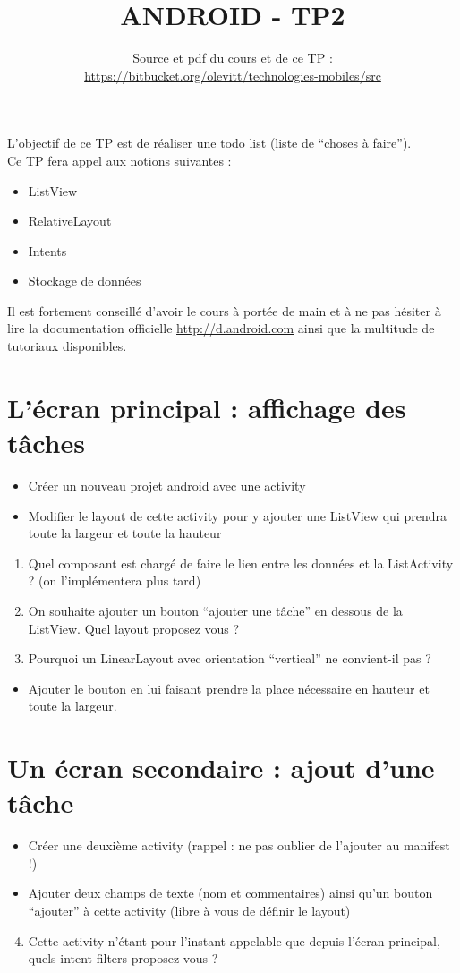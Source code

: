 \documentclass{article}
\title{ANDROID - TP2}
\date{Source et pdf du cours et de ce TP
:\\ \href{https://bitbucket.org/olevitt/technologies-mobiles}{https://bitbucket.org/olevitt/technologies-mobiles/src}}
\begin{document}
\maketitle
L'objectif de ce TP est de réaliser une todo list (liste de ``choses à faire'').\\
Ce TP fera appel aux notions suivantes :
\begin{itemize}
  \item ListView
  \item RelativeLayout
  \item Intents
  \item Stockage de données
\end{itemize}
Il est fortement conseillé d'avoir le cours à portée de main et à ne pas hésiter à lire la documentation officielle
\href{http://d.android.com}{http://d.android.com} ainsi que la multitude de tutoriaux disponibles.\\

\section{L'écran principal : affichage des tâches}
\begin{itemize}
  \item Créer un nouveau projet android avec une activity
  \item Modifier le layout de cette activity pour y ajouter une ListView qui prendra toute la largeur et toute la hauteur
\end{itemize}
\begin{enumerate}
 \setcounter{enumi}{0}
 \item Quel composant est chargé de faire le lien entre les données et la ListActivity ? (on l'implémentera plus tard)
\item On souhaite ajouter un bouton ``ajouter une tâche'' en dessous de la ListView. Quel layout proposez vous ?
\item Pourquoi un LinearLayout avec orientation ``vertical'' ne convient-il pas ?
\end{enumerate}
\begin{itemize}
  \item Ajouter le bouton en lui faisant prendre la place nécessaire en hauteur et toute la largeur.
\end{itemize}
\section{Un écran secondaire : ajout d'une tâche}
\begin{itemize}
  \item Créer une deuxième activity (rappel : ne pas oublier de l'ajouter au manifest !)
  \item Ajouter deux champs de texte (nom et commentaires) ainsi qu'un bouton ``ajouter'' à cette activity (libre à vous de définir le layout)
\end{itemize}
\begin{enumerate}
 \setcounter{enumi}{3}
\item Cette activity n'étant pour l'instant appelable que depuis l'écran principal, quels intent-filters proposez vous ? 
\end{enumerate}
\end{document}
